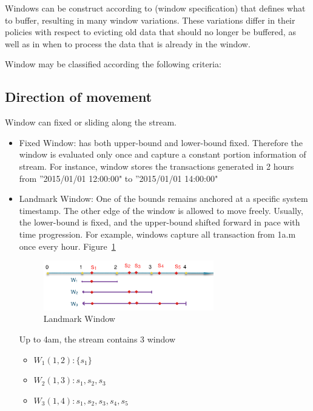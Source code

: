 Windows can be construct according to (window specification) that defines what to buffer, resulting in many window variations. These variations differ in their policies with respect to evicting old data that should no longer be buffered, as well as in when to process the data that is already in the window.\citep{Henrique:2014}


Window may be classified according the following criteria:

\subsection{Direction of movement}
Window can fixed or sliding along the stream.
\begin{itemize}

\item Fixed Window:  has both upper-bound and lower-bound fixed. Therefore the window is evaluated only once and capture a constant portion information of stream. For instance, window stores the transactions generated in 2 hours from ''2015/01/01 12:00:00" to ''2015/01/01 14:00:00"

\item Landmark Window: One of the bounds remains  anchored at a specific system timestamp. The other edge of the window is allowed to move freely. Usually, the lower-bound is fixed, and the upper-bound shifted forward in pace with time progression.
For example, windows capture all transaction from 1a.m once every hour. Figure~\ref{fig:landMarkWin}

\begin{figure}[htbp!] 
\centering    
\includegraphics[width=0.7\textwidth]{landMarkWin}
\caption{Landmark Window}
\label{fig:landMarkWin}
\end{figure}

Up to 4am, the stream contains 3 window 
\begin{itemize}
\item $W_1(1,2):\{s_1\}$ 
\item $W_2(1,3):{s_1, s_2, s_3}$ 
\item $W_3(1,4):{s_1, s_2, s_3, s_4,s_5}$ 
\end{itemize}


\end{itemize}
